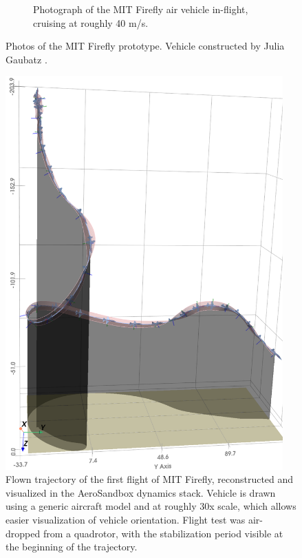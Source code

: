 \begin{figure}[h]
\begin{subfigure}[b]{0.432\textwidth}
        \caption{Photograph of the MIT Firefly air vehicle in-flight, cruising at roughly 40 m/s.}
    \end{subfigure}
    \caption{Photos of the MIT Firefly prototype. Vehicle constructed by Julia Gaubatz \cite{gaubatz_design_2024}.}
    \label{fig:firefly_flight_test}
\end{figure}

\begin{figure}[h]
    \centering
    \includegraphics[width=0.95\textwidth,trim={0 0.2in 0 0.8in}]{../figures/firefly_flight_render.png}
    \caption{Flown trajectory of the first flight of MIT Firefly, reconstructed and visualized in the AeroSandbox dynamics stack. Vehicle is drawn using a generic aircraft model and at roughly 30x scale, which allows easier visualization of vehicle orientation. Flight test was air-dropped from a quadrotor, with the stabilization period visible at the beginning of the trajectory.}
    \label{fig:firefly_flight_render}
\end{figure}


